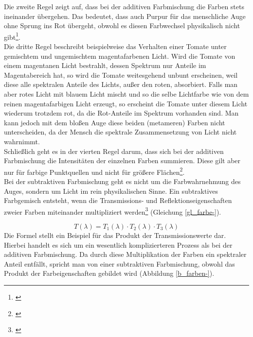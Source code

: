 \noindent Die zweite Regel zeigt auf, dass bei der additiven Farbmischung die Farben stets ineinander übergehen. Das bedeutet, dass auch Purpur für das menschliche Auge ohne Sprung ins Rot übergeht, obwohl es diesen Farbwechsel physikalisch nicht gibt\footnote{\cite[5]{mungenast}}.\\
Die dritte Regel beschreibt beispielweise das Verhalten einer Tomate unter gemischtem und ungemischtem magentafarbenen Licht. Wird die Tomate von einem magentanen Licht bestrahlt, dessen Spektrum nur Anteile im Magentabereich hat, so wird die Tomate weitesgehend unbunt erscheinen, weil diese alle spektralen Anteile des Lichts, außer den roten, absorbiert. Falls man aber rotes Licht mit blauem Licht mischt und so die selbe Lichtfarbe wie von dem reinen magentafarbigen Licht erzeugt, so erscheint die Tomate unter diesem Licht wiederum trotzdem rot, da die Rot-Anteile im Spektrum vorhanden sind. Man kann jedoch mit dem bloßen Auge diese beiden (metameren) Farben nicht unterscheiden, da der Mensch die spektrale Zusammensetzung von Licht nicht wahrnimmt.\\
Schließlich geht es in der vierten Regel darum, dass sich bei der additiven Farbmischung die Intensitäten der einzelnen Farben summieren. Diese gilt aber nur für farbige  Punktquellen und nicht für größere Flächen\footnote{\cite[5]{mungenast}}.\\
Bei der subtraktiven Farbmischung geht es nicht um die Farbwahrnehmung des Auges, sondern um Licht im rein physikalischen Sinne. Ein subtraktives Farbgemisch entsteht, wenn die Transmissions- und Reflektionseigenschaften zweier Farben miteinander multipliziert werden\footnote{\cite[84]{greule}} (Gleichung \ref{gl_farbe-}).

\begin{equation}\label{gl_farbe-}
		T(\lambda) = T_{1}(\lambda) \cdot T_{2}(\lambda) \cdot T_{3}(\lambda)
	\end{equation}
Die Formel stellt ein Beispiel für das Produkt der Transmissionswerte dar.
Hierbei handelt es sich um ein wesentlich komplizierteren Prozess als bei der additiven Farbmischung. Da durch diese Multiplikation der Farben ein spektraler Anteil entfällt, spricht man von einer subtraktiven Farbmischung, obwohl das Produkt der Farbeigenschaften gebildet wird (Abbildung \ref{b_farben-}).

